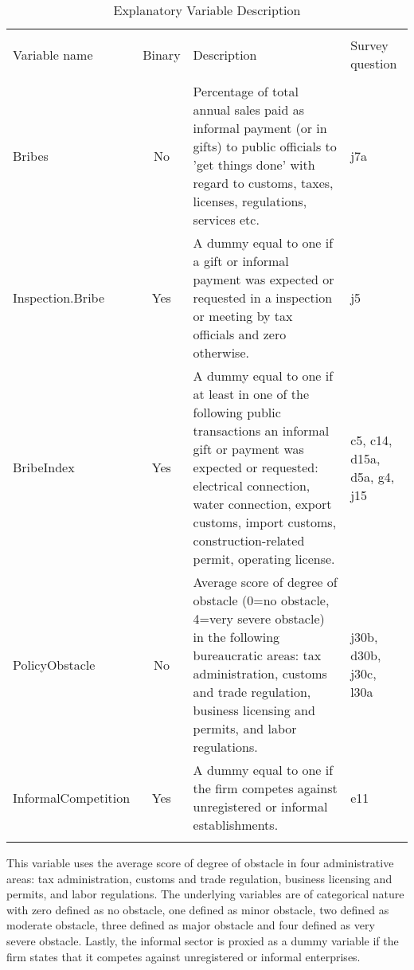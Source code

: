\begin{table}[!h] \centering 
  \caption{Explanatory Variable Description} 
  \label{}
  \begin{adjustbox}{width=\columnwidth,center}
\begin{tabular}{@{\extracolsep{5pt}}lcp{10cm}p{3cm}} 
\\[-1.8ex]\hline 
\hline \\[-1.8ex] 
Variable name & \multicolumn{1}{c}{Binary} & Description & Survey question \\ 
\hline \\[-1.8ex] 
Bribes & No & Percentage of total annual sales paid as informal payment (or in gifts) to public officials to 'get things done' with regard to customs, taxes, licenses, regulations, services etc. & j7a  \\ 
Inspection.Bribe & Yes & A dummy equal to one if a gift or informal payment was expected or requested in a inspection or meeting by tax officials and zero otherwise. & j5 \\ 
BribeIndex & Yes & A dummy equal to one if at least in one of the following public transactions an informal gift or payment was expected or requested: electrical connection, water connection, export customs, import customs, construction-related permit, operating license. & c5, c14, d15a, d5a, g4, j15 \\ 
PolicyObstacle & No & Average score of degree of obstacle (0=no obstacle, 4=very severe obstacle) in the following bureaucratic areas: tax administration, customs and trade regulation, business licensing and permits, and labor regulations. & j30b, d30b, j30c, l30a \\ 
InformalCompetition & Yes & A dummy equal to one if the firm competes against unregistered or informal establishments. & e11  \\ 
\hline \\[-1.8ex] 
\end{tabular} 
\end{adjustbox}
\end{table}

This variable uses the average score of degree of obstacle in four administrative areas: tax administration, customs and trade regulation, business licensing and permits, and labor regulations. The underlying variables are of categorical nature with zero defined as no obstacle, one defined as minor obstacle, two defined as moderate obstacle, three defined as major obstacle and four defined as very severe obstacle. 
Lastly, the informal sector is proxied as a dummy variable if the firm states that it competes against unregistered or informal enterprises. 


